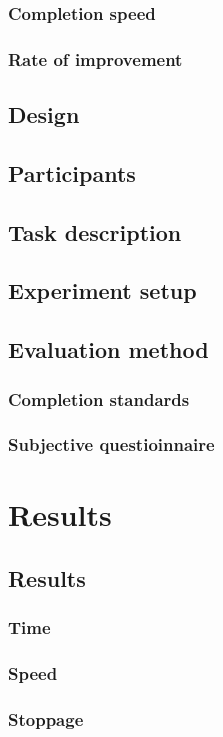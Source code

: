   \subsection{Completion speed}
  \subsection{Rate of improvement}
\section{Design}
\section{Participants}
\section{Task description}
\section{Experiment setup}
\section{Evaluation method}
  \subsection{Completion standards}
  \subsection{Subjective questioinnaire}

\chapter{Results}
\label{ch:results}
\section{Results}
  \subsection{Time}
  \subsection{Speed}
  \subsection{Stoppage}
